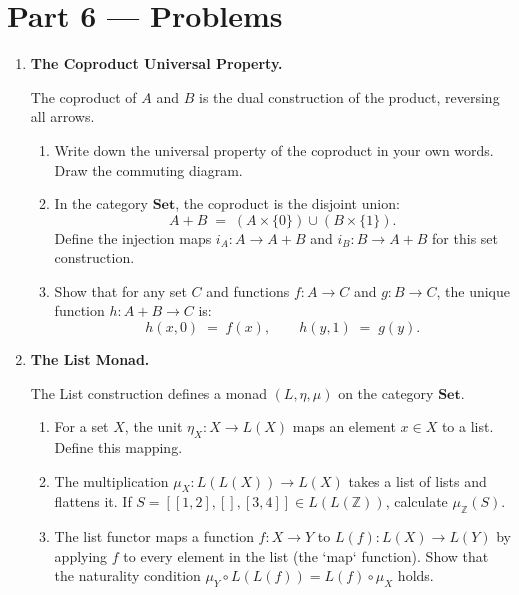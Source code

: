 \documentclass[12pt, a4paper]{article}
\begin{document}
\newpage

\section{Part 6 --- Problems}

\begin{enumerate}[label=\textbf{P\arabic*.}]
  \item \textbf{The Coproduct Universal Property.}
  
        The coproduct of $A$ and $B$ is the dual construction of the product, reversing all arrows.
        \begin{enumerate}[label=(\alph*)]
          \item Write down the universal property of the coproduct in your own words. Draw the commuting diagram.
          \item In the category $\mathbf{Set}$, the coproduct is the disjoint union:
          \[
            A + B \;=\; (A \times \{0\}) \cup (B \times \{1\}).
          \]
          Define the injection maps $i_A: A \to A+B$ and $i_B: B \to A+B$ for this set construction.
          \item Show that for any set $C$ and functions $f: A \to C$ and $g: B \to C$, the unique function $h: A+B \to C$ is:
          \[
            h(x, 0) \;=\; f(x), \qquad h(y, 1) \;=\; g(y).
          \]
        \end{enumerate}

  \item \textbf{The List Monad.}
  
        The List construction defines a monad $(L, \eta, \mu)$ on the category $\mathbf{Set}$.
        \begin{enumerate}[label=(\alph*)]
          \item For a set $X$, the unit $\eta_X: X \to L(X)$ maps an element $x \in X$ to a list. Define this mapping.
          \item The multiplication $\mu_X: L(L(X)) \to L(X)$ takes a list of lists and flattens it.
                If $S = [[1, 2], [], [3, 4]] \in L(L(\mathbb{Z}))$, calculate $\mu_{\mathbb{Z}}(S)$.
          \item The list functor maps a function $f: X \to Y$ to $L(f): L(X) \to L(Y)$ by applying $f$ to every element in the list (the `map` function).
                Show that the naturality condition $\mu_Y \circ L(L(f)) = L(f) \circ \mu_X$ holds.
        \end{enumerate}
\end{enumerate}
\end{document}
